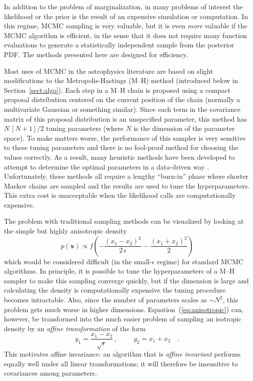 \documentclass[12pt,preprint]{aastex}
\newcommand{\Eq}[1]{Equation~(\ref{eq:#1})}
\newcommand{\eqlabel}[1]{\label{eq:#1}}
\newcommand{\Sect}[1]{Section~\ref{sect:#1}}
\newcommand{\sect}[1]{\Sect{#1}}
\begin{document}
In addition to the problem of marginalization, in many problems of
interest the likelihood or the prior is the result of an expensive
simulation or computation. In this regime, MCMC sampling is very
valuable, but it is even \emph{more} valuable if the MCMC algorithm is
efficient, in the sense that it does not require many function
evaluations to generate a statistically independent sample from the
posterior PDF.  The methods presented here are designed for efficiency.

Most uses of MCMC in the astrophysics literature are based on slight
modifications to the Metropolis-Hastings (M--H) method (introduced
below in \sect{algo}).  Each step in a M--H chain is proposed using a
compact proposal distribution centered on the current position of the
chain (normally a multivariate Gaussian or something similar). Since
each term in the covariance matrix of this proposal distribution is an
unspecified parameter, this method has $N\,[N+1]/2$ tuning parameters
(where $N$ is the dimension of the parameter space).  To make matters
worse, the performance of this sampler is very sensitive to these
tuning parameters and there is no fool-proof method for choosing the
values correctly. As a result, many heuristic methods have been
developed to attempt to determine the optimal parameters in a
data-driven way \citep[for
  example,][]{Gregory:2005,Dunkley:2005,Widrow:2008}. Unfortunately,
these methods all require a lengthy ``burn-in'' phase where shorter
Markov chains are sampled and the results are used to tune the
hyperparameters. This extra cost is unacceptable when the likelihood
calls are computationally expensive.

The problem with traditional sampling methods can be visualized by looking
at the simple but highly anisotropic density
\begin{equation}
    \eqlabel{anisotropic}
    p(\mathbf{x}) \propto f \left (-\frac{(x_1-x_2)^2}{2\,\epsilon}
                                        - \frac{(x_1+x_2)^2}{2} \right )
\end{equation}
which would be considered difficult (in the small-$\epsilon$ regime) for
standard MCMC algorithms. In principle, it is possible to tune the
hyperparameters of a M--H sampler to make this sampling converge quickly,
but if the dimension is large and calculating the density
is computationally expensive the tuning procedure becomes intractable.
Also, since the number of parameters scales as $\sim N^2$, this problem gets
much worse in higher dimensions.
\Eq{anisotropic} can, however, be transformed into the much easier problem of
sampling an isotropic density by an \emph{affine transformation} of the form
\begin{equation}
    y_1 = \frac{x_1-x_2}{\sqrt{\epsilon}} \, ,
        \hspace{1cm} y_2 = x_1 + x_2 \quad .
\end{equation}
This motivates affine invariance: an algorithm that is \emph{affine invariant}
performs equally well under all linear transformations; it will therefore be
insensitive to
covariances among parameters.
\end{document}
